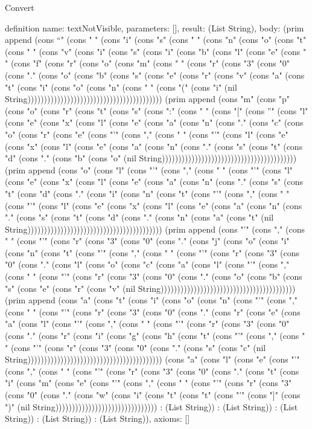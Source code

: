 \begin{lexlean}{Convert}
\begin{semanticmodule}
definition{
  name: textNotVisible,
  parameters: [],
  result: (List String),
  body: (prim append (cons "`" (cons " " (cons "i" (cons "s" (cons " " (cons "n" (cons "o" (cons "t" (cons " " (cons "v" (cons "i" (cons "s" (cons "i" (cons "b" (cons "l" (cons "e" (cons " " (cons "f" (cons "r" (cons "o" (cons "m" (cons " " (cons "r" (cons "3" (cons "0" (cons "." (cons "o" (cons "b" (cons "s" (cons "e" (cons "r" (cons "v" (cons "a" (cons "t" (cons "i" (cons "o" (cons "n" (cons " " (cons "(" (cons "i" (nil String))))))))))))))))))))))))))))))))))))))))) (prim append (cons "m" (cons "p" (cons "o" (cons "r" (cons "t" (cons "s" (cons ":" (cons " " (cons "[" (cons "'" (cons "l" (cons "e" (cons "x" (cons "l" (cons "e" (cons "a" (cons "n" (cons "." (cons "c" (cons "o" (cons "r" (cons "e" (cons "'" (cons "," (cons " " (cons "'" (cons "l" (cons "e" (cons "x" (cons "l" (cons "e" (cons "a" (cons "n" (cons "." (cons "s" (cons "t" (cons "d" (cons "." (cons "b" (cons "o" (nil String))))))))))))))))))))))))))))))))))))))))) (prim append (cons "o" (cons "l" (cons "'" (cons "," (cons " " (cons "'" (cons "l" (cons "e" (cons "x" (cons "l" (cons "e" (cons "a" (cons "n" (cons "." (cons "s" (cons "t" (cons "d" (cons "." (cons "i" (cons "n" (cons "t" (cons "'" (cons "," (cons " " (cons "'" (cons "l" (cons "e" (cons "x" (cons "l" (cons "e" (cons "a" (cons "n" (cons "." (cons "s" (cons "t" (cons "d" (cons "." (cons "n" (cons "a" (cons "t" (nil String))))))))))))))))))))))))))))))))))))))))) (prim append (cons "'" (cons "," (cons " " (cons "'" (cons "r" (cons "3" (cons "0" (cons "." (cons "j" (cons "o" (cons "i" (cons "n" (cons "t" (cons "'" (cons "," (cons " " (cons "'" (cons "r" (cons "3" (cons "0" (cons "." (cons "l" (cons "o" (cons "c" (cons "a" (cons "l" (cons "'" (cons "," (cons " " (cons "'" (cons "r" (cons "3" (cons "0" (cons "." (cons "o" (cons "b" (cons "s" (cons "e" (cons "r" (cons "v" (nil String))))))))))))))))))))))))))))))))))))))))) (prim append (cons "a" (cons "t" (cons "i" (cons "o" (cons "n" (cons "'" (cons "," (cons " " (cons "'" (cons "r" (cons "3" (cons "0" (cons "." (cons "r" (cons "e" (cons "a" (cons "l" (cons "'" (cons "," (cons " " (cons "'" (cons "r" (cons "3" (cons "0" (cons "." (cons "r" (cons "i" (cons "g" (cons "h" (cons "t" (cons "'" (cons "," (cons " " (cons "'" (cons "r" (cons "3" (cons "0" (cons "." (cons "s" (cons "c" (nil String))))))))))))))))))))))))))))))))))))))))) (cons "a" (cons "l" (cons "e" (cons "'" (cons "," (cons " " (cons "'" (cons "r" (cons "3" (cons "0" (cons "." (cons "t" (cons "i" (cons "m" (cons "e" (cons "'" (cons "," (cons " " (cons "'" (cons "r" (cons "3" (cons "0" (cons "." (cons "w" (cons "i" (cons "t" (cons "t" (cons "'" (cons "]" (cons ")" (nil String))))))))))))))))))))))))))))))) : (List String)) : (List String)) : (List String)) : (List String)) : (List String)),
  axioms: []
}


\end{semanticmodule}
\end{lexlean}
